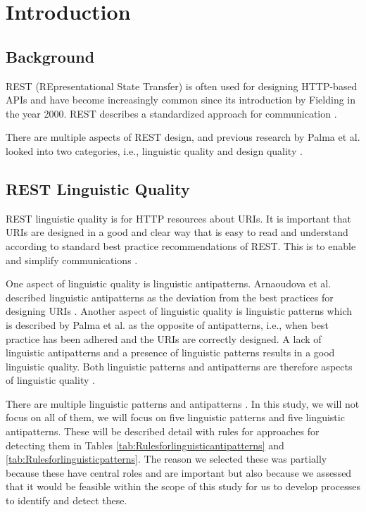 \section{Introduction}

\subsection{Background}
REST (REpresentational State Transfer) is often used for designing HTTP-based APIs and have become increasingly common since its introduction by Fielding in the year 2000. REST describes a standardized approach for communication \cite{restdissertation}.

There are multiple aspects of REST design, and previous research by Palma et al. looked into two categories, i.e., linguistic quality and design quality \cite{design}\cite{linguistic}.

\subsection{REST Linguistic Quality}

REST linguistic quality is for HTTP resources about URIs. It is important that URIs are designed in a good and clear way that is easy to read and understand according to standard best practice recommendations of REST. This is to enable and simplify communications \cite{restdissertation}\cite{linguistic}. 

One aspect of linguistic quality is linguistic antipatterns. Arnaoudova et al. described linguistic antipatterns as the deviation from the best practices for designing URIs \cite{arnaoudova}. Another aspect of linguistic quality is linguistic patterns which is described by Palma et al. as the opposite of antipatterns, i.e., when best practice has been adhered and the URIs are correctly designed. A lack of linguistic antipatterns and a presence of linguistic patterns results in a good linguistic quality. Both linguistic patterns and antipatterns are therefore aspects of linguistic quality \cite{linguistic}.

There are multiple linguistic patterns and antipatterns \cite{linguistic}. In this study, we will not focus on all of them, we will focus on five linguistic patterns and five linguistic antipatterns. These will be described detail with rules for approaches for detecting them in Tables \ref{tab:Rulesforlinguisticantipatterns} and \ref{tab:Rulesforlinguisticpatterns}. The reason we selected these was partially because these have central roles and are important but also because we assessed that it would be feasible within the scope of this study for us to  develop processes to identify and detect these.

